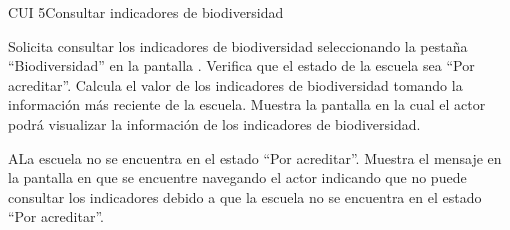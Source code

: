 \begin{UseCase}{CUI 5}{Consultar indicadores de biodiversidad}
	



	

	
\end{UseCase}
 \begin{UCtrayectoria}
    \UCpaso[\UCactor] Solicita consultar los indicadores de biodiversidad seleccionando la pestaña ``Biodiversidad'' en la pantalla .
    \UCpaso[\UCsist] Verifica que el estado de la escuela sea ``Por acreditar''.   
    \UCpaso[\UCsist] Calcula el valor de los indicadores de  biodiversidad tomando la información más reciente de la escuela.%
    \UCpaso[\UCsist] Muestra la pantalla  en la cual el actor podrá visualizar la información de los indicadores de biodiversidad.
\end{UCtrayectoria}
 
 \begin{UCtrayectoriaA}{A}{La escuela no se encuentra en el estado ``Por acreditar''.}
    \UCpaso[\UCsist] Muestra el mensaje  en la pantalla en que se encuentre navegando el
    actor indicando que no puede consultar los indicadores debido a que la escuela no se encuentra en el estado ``Por acreditar''. 
 \end{UCtrayectoriaA}
